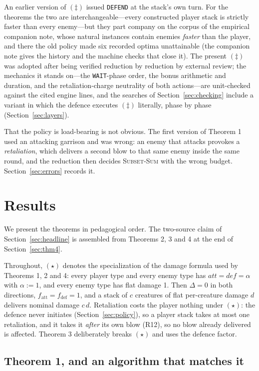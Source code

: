 \documentclass[11pt,a4paper]{article}
\theoremstyle{plain}
\theoremstyle{definition}
\theoremstyle{plain}
\theoremstyle{definition}
\theoremstyle{remark}
\newcommand{\SUBSETSUM}{\textsc{Subset-Sum}}
\begin{document}
An earlier version of $(\ddagger)$ issued \texttt{DEFEND} at the stack's own turn. For the
theorems the two are interchangeable---every constructed player stack is strictly faster than
every enemy---but they part company on the corpus of the empirical companion note, whose
natural instances contain enemies \emph{faster} than the player, and there the old policy made
six recorded optima unattainable (the companion note gives the history and the machine
checks that close it). The present $(\ddagger)$ was adopted after being verified reduction by
reduction by external review; the mechanics it stands on---the \texttt{WAIT}-phase order, the
bonus arithmetic and duration, and the retaliation-charge neutrality of both actions---are
unit-checked against the cited engine lines, and the searches of Section~\ref{sec:checking}
include a variant in which the defence executes $(\ddagger)$ literally, phase by phase
(Section~\ref{sec:layers}).

That the policy is load-bearing is not obvious. The first version of Theorem 1 used an
attacking garrison and was wrong: an enemy that attacks provokes a \emph{retaliation}, which
delivers a second blow to that same enemy inside the same round, and the reduction then decides
\SUBSETSUM{} with the wrong budget. Section~\ref{sec:errors} records it.

\section{Results}\label{sec:results}

We present the theorems in pedagogical order. The two-source claim of
Section~\ref{sec:headline} is assembled from Theorems 2, 3 and 4 at the end of
Section~\ref{sec:thm4}.

Throughout, $(\star)$ denotes the specialization of the damage formula used by Theorems 1, 2
and 4: every player type and every enemy type has
$\mathit{att}=\mathit{def}=\alpha$ with $\alpha:=1$, and every enemy type has flat damage 1.
Then $\Delta=0$ in both directions, $f_{\mathrm{att}}=f_{\mathrm{def}}=1$, and a stack of $c$
creatures of flat per-creature damage $d$ delivers nominal damage $c\,d$. Retaliation costs the
player nothing under $(\star)$: the defence never initiates (Section~\ref{sec:policy}), so a
player stack takes at most one retaliation, and it takes it \emph{after} its own blow (R12),
so no blow already delivered is affected. Theorem 3 deliberately breaks $(\star)$ and uses the
defence factor.

\subsection{Theorem 1, and an algorithm that matches it}\label{sec:thm1}
\end{document}

